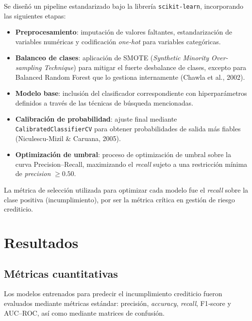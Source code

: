 \documentclass[journal]{apa7}
\begin{document}
Se diseñó un pipeline estandarizado bajo la librería \texttt{scikit-learn}, incorporando las siguientes etapas:

\begin{itemize}
  \item \textbf{Preprocesamiento}: imputación de valores faltantes, estandarización de variables numéricas y codificación \emph{one-hot} para variables categóricas.
  \item \textbf{Balanceo de clases}: aplicación de SMOTE (\emph{Synthetic Minority Over-sampling Technique}) para mitigar el fuerte desbalance de clases, excepto para Balanced Random Forest que lo gestiona internamente (Chawla et al., 2002).
  \item \textbf{Modelo base}: inclusión del clasificador correspondiente con hiperparámetros definidos a través de las técnicas de búsqueda mencionadas.
  \item \textbf{Calibración de probabilidad}: ajuste final mediante \texttt{CalibratedClassifierCV} para obtener probabilidades de salida más fiables (Niculescu-Mizil \& Caruana, 2005).
  \item \textbf{Optimización de umbral}: proceso de optimización de umbral sobre la curva Precision–Recall, maximizando el \emph{recall} sujeto a una restricción mínima de \emph{precision} $\geq 0.50$.
\end{itemize}

La métrica de selección utilizada para optimizar cada modelo fue el \emph{recall} sobre la clase positiva (incumplimiento), por ser la métrica crítica en gestión de riesgo crediticio.

\section{Resultados}

\subsection{Métricas cuantitativas}

Los modelos entrenados para predecir el incumplimiento crediticio fueron evaluados mediante métricas estándar: precisión, \emph{accuracy}, \emph{recall}, F1‐score y AUC–ROC, así como mediante matrices de confusión.
\end{document}
